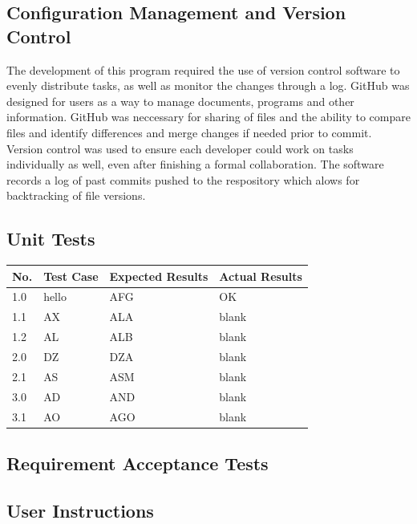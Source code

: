 \documentclass[12pt, a4]{report}
\begin{document}
	
	\pagebreak
	\subsection{Configuration Management and Version Control}
		\par 
		The development of this program required the use of version control software to evenly distribute tasks, as well as monitor the changes through a log. GitHub was designed for users as a way to manage documents, programs and other information. GitHub was neccessary for sharing of files and the ability to compare files and identify differences and merge changes if needed prior to commit. Version control was used to ensure each developer could work on tasks individually as well, even after finishing a formal collaboration. The software records a log of past commits pushed to the respository which alows for backtracking of file versions.
	
	\subsection{Unit Tests}
	

	
		\begin{tabular}{ |p{0.5cm}|p{4cm}|p{5cm}|p{5cm}| }

			\hline
			No. & Test Case & Expected Results & Actual Results \\
			\hline
			1.0 & hello &AFG & OK \\
			1.1 & AX   & ALA & blank\\
			1.2 &AL & ALB & blank \\
			2.0    &DZ & DZA & blank \\
			2.1 & AS & ASM & blank\\
			3.0 & AD & AND   & blank \\
			3.1 & AO & AGO & blank\\
			\hline
		\end{tabular}
		
	\subsection{Requirement Acceptance Tests}

	\subsection{User Instructions}



	
\end{document}

